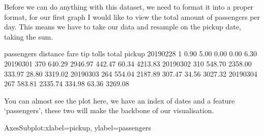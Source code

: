 \documentclass[letterpaper,10pt,english]{jupyterBook}
\begin{document}
\sphinxAtStartPar
Before we can do anything with this dataset, we need to format it into a proper format, for our first graph I would like to view the total amount of passengers per day.
This means we have to take our data and resample on the pickup date, taking the sum.

\begin{sphinxVerbatim}[commandchars=\\\{\}]
  
\end{sphinxVerbatim}

\begin{sphinxVerbatim}[commandchars=\\\{\}]
            passengers  distance     fare     tip  tolls    total
pickup                                                           
2019\PYGZhy{}02\PYGZhy{}28           1      0.90     5.00    0.00   0.00     6.30
2019\PYGZhy{}03\PYGZhy{}01         370    640.29  2946.97  442.47  60.34  4213.83
2019\PYGZhy{}03\PYGZhy{}02         310    548.70  2358.00  333.97  28.80  3319.02
2019\PYGZhy{}03\PYGZhy{}03         264    554.04  2187.89  307.47  34.56  3027.32
2019\PYGZhy{}03\PYGZhy{}04         267    583.81  2335.74  334.98  63.36  3269.08
\end{sphinxVerbatim}

\sphinxAtStartPar
You can almost see the plot here, we have an index of dates and a feature ‘passengers’, these two will make the backbone of our visualisation.

\begin{sphinxVerbatim}[commandchars=\\\{\}]
 
\end{sphinxVerbatim}

\begin{sphinxVerbatim}[commandchars=\\\{\}]
\PYGZlt{}AxesSubplot:xlabel=\PYGZsq{}pickup\PYGZsq{}, ylabel=\PYGZsq{}passengers\PYGZsq{}\PYGZgt{}
\end{sphinxVerbatim}
\end{document}
